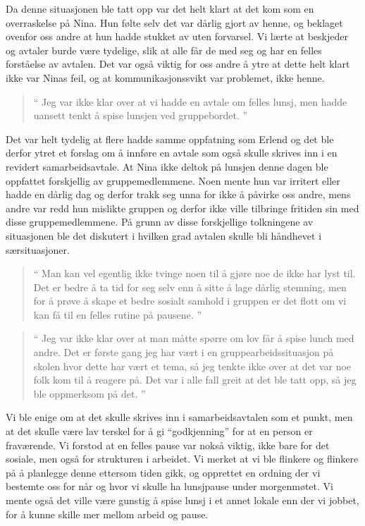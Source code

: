 Da denne situasjonen ble tatt opp var det helt klart at det kom som en overraskelse på Nina. Hun følte selv det var dårlig gjort av henne, og beklaget ovenfor oss andre at hun hadde stukket av uten forvarsel. Vi lærte at beskjeder og avtaler burde være tydelige, slik at alle får de med seg og har en felles forståelse av avtalen. Det var også viktig for oss andre å ytre at dette helt klart ikke var Ninas feil, og at kommunikasjonssvikt var problemet, ikke henne. 

\begin{quote}``
Jeg var ikke klar over at vi hadde en avtale om felles lunsj, men hadde uansett tenkt å spise lunsjen ved gruppebordet.
''\end{quote} 

Det var helt tydelig at flere hadde samme oppfatning som Erlend og det ble derfor ytret et forslag om å innføre en avtale som også skulle skrives inn i en revidert samarbeidsavtale. At Nina ikke deltok på lunsjen denne dagen ble oppfattet forskjellig av gruppemedlemmene. Noen mente hun var irritert eller hadde en dårlig dag og derfor trakk seg unna for ikke å påvirke oss andre, mens andre var redd hun mislikte gruppen og derfor ikke ville tilbringe fritiden sin med disse gruppemedlemmene. På grunn av disse forskjellige tolkningene av situasjonen ble det diskutert i hvilken grad avtalen skulle bli håndhevet i særsituasjoner. 

\begin{quote}``
Man kan vel egentlig ikke tvinge noen til å gjøre noe de ikke har lyst til. Det er bedre å ta tid for seg selv enn å sitte å lage dårlig stemning, men for å prøve å skape et bedre sosialt samhold i gruppen er det flott om vi kan få til en felles rutine på pausene.
''\end{quote} 

\begin{quote}``
Jeg var ikke klar over at man måtte spørre om lov får å spise lunch med andre. Det er første gang jeg har vært i en gruppearbeidssituasjon på skolen hvor dette har vært et tema, så jeg tenkte ikke over at det var noe folk kom til å reagere på. Det var i alle fall greit at det ble tatt opp, så jeg ble oppmerksom på det.
''\end{quote} 

Vi ble enige om at det skulle skrives inn i samarbeidsavtalen som et punkt, men at det skulle være lav terskel for å gi ``godkjenning'' for at en person er fraværende. Vi forstod at en felles pause var nokså viktig, ikke bare for det sosiale, men også for strukturen i arbeidet. Vi merket at vi ble flinkere og flinkere på å planlegge denne ettersom tiden gikk, og opprettet en ordning der vi bestemte oss for når og hvor vi skulle ha lunsjpause under morgenmøtet. Vi mente også det ville være gunstig å spise lunsj i et annet lokale enn der vi jobbet, for å kunne skille mer mellom arbeid og pause.

